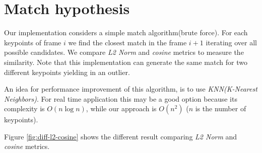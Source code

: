 \section{Match hypothesis}

Our implementation considers a simple match algorithm(brute force). For each keypoints of frame $i$ we find the closest match in the frame $i+1$ iterating over all possible candidates. We compare \textit{L2 Norm} and \textit{cosine} metrics to measure the similarity. Note that this implementation can generate the same match for two different keypoints yielding in an outlier.

An idea for performance improvement of this algorithm, is to use \textit{KNN(K-Nearest Neighbors)}. For real time application this may be a good option because its complexity is $O(n\log n)$, while our approach is $O(n^2)$ ($n$ is the number of keypoints).

Figure \ref{fig:diff-l2-cosine} shows the different result comparing \textit{L2 Norm} and \textit{cosine} metrics.


